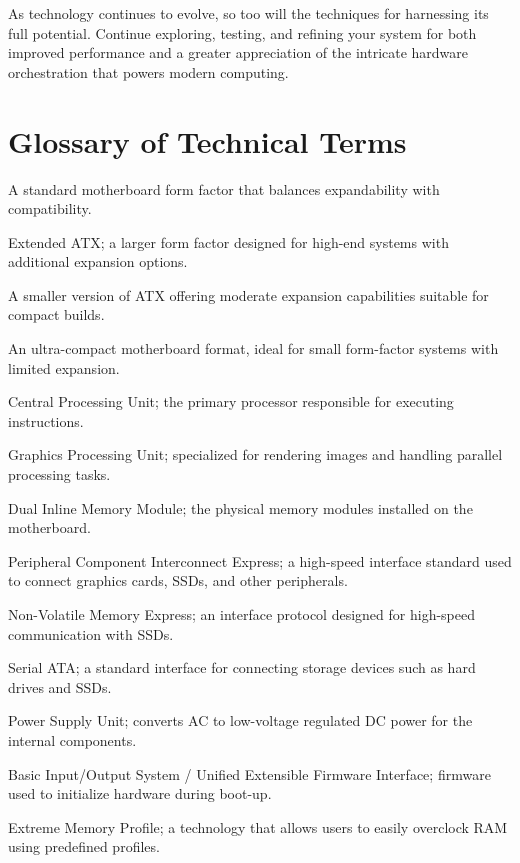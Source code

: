 \documentclass{article}
\begin{document}
As technology continues to evolve, so too will the techniques for harnessing its full potential. Continue exploring, testing, and refining your system for both improved performance and a greater appreciation of the intricate hardware orchestration that powers modern computing.

\section{Glossary of Technical Terms}
\begin{description}[style=multiline, labelwidth=3cm, leftmargin=!, itemsep=5pt]
    \item[ATX] A standard motherboard form factor that balances expandability with compatibility.
    \item[E-ATX] Extended ATX; a larger form factor designed for high-end systems with additional expansion options.
    \item[Micro-ATX] A smaller version of ATX offering moderate expansion capabilities suitable for compact builds.
    \item[Mini-ITX] An ultra-compact motherboard format, ideal for small form-factor systems with limited expansion.
    \item[CPU] Central Processing Unit; the primary processor responsible for executing instructions.
    \item[GPU] Graphics Processing Unit; specialized for rendering images and handling parallel processing tasks.
    \item[DIMM] Dual Inline Memory Module; the physical memory modules installed on the motherboard.
    \item[PCIe] Peripheral Component Interconnect Express; a high-speed interface standard used to connect graphics cards, SSDs, and other peripherals.
    \item[NVMe] Non-Volatile Memory Express; an interface protocol designed for high-speed communication with SSDs.
    \item[SATA] Serial ATA; a standard interface for connecting storage devices such as hard drives and SSDs.
    \item[PSU] Power Supply Unit; converts AC to low-voltage regulated DC power for the internal components.
    \item[BIOS/UEFI] Basic Input/Output System / Unified Extensible Firmware Interface; firmware used to initialize hardware during boot-up.
    \item[XMP] Extreme Memory Profile; a technology that allows users to easily overclock RAM using predefined profiles.

\end{description}
\end{document}
